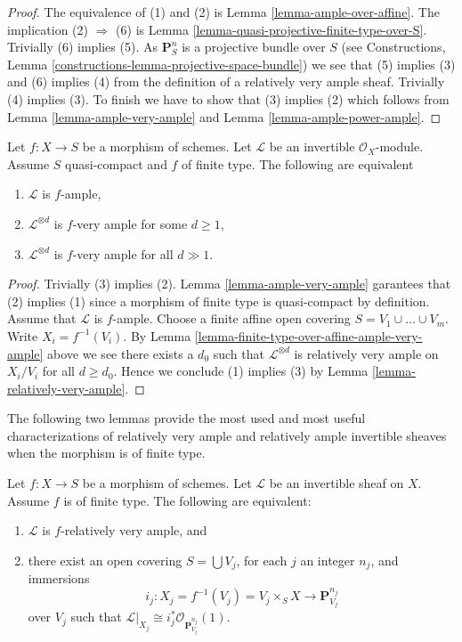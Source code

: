\begin{proof}
The equivalence of (1) and (2) is Lemma \ref{lemma-ample-over-affine}.
The implication (2) $\Rightarrow$ (6) is
Lemma \ref{lemma-quasi-projective-finite-type-over-S}.
Trivially (6) implies (5).
As $\mathbf{P}^n_S$ is a projective bundle over $S$ (see
Constructions, Lemma \ref{constructions-lemma-projective-space-bundle})
we see that
(5) implies (3) and (6) implies (4) from the definition of a
relatively very ample sheaf.
Trivially (4) implies (3). To finish we have to show that
(3) implies (2) which follows from Lemma \ref{lemma-ample-very-ample}
and Lemma \ref{lemma-ample-power-ample}.
\end{proof}

\begin{lemma}
\label{lemma-finite-type-ample-very-ample}
Let $f : X \to S$ be a morphism of schemes.
Let $\mathcal{L}$ be an invertible $\mathcal{O}_X$-module.
Assume $S$ quasi-compact and $f$ of finite type.
The following are equivalent
\begin{enumerate}
\item $\mathcal{L}$ is $f$-ample,
\item $\mathcal{L}^{\otimes d}$ is $f$-very ample for some $d \geq 1$,
\item $\mathcal{L}^{\otimes d}$ is $f$-very ample for all $d \gg 1$.
\end{enumerate}
\end{lemma}

\begin{proof}
Trivially (3) implies (2). Lemma \ref{lemma-ample-very-ample} garantees that
(2) implies (1) since a morphism of finite type is quasi-compact
by definition. Assume that $\mathcal{L}$ is $f$-ample. Choose a finite affine
open covering $S = V_1 \cup \ldots \cup V_m$. Write $X_i = f^{-1}(V_i)$.
By Lemma \ref{lemma-finite-type-over-affine-ample-very-ample} above we see
there exists a $d_0$ such that $\mathcal{L}^{\otimes d}$ is
relatively very ample on $X_i/V_i$ for all $d \geq d_0$. Hence we conclude
(1) implies (3) by Lemma \ref{lemma-relatively-very-ample}.
\end{proof}

\noindent
The following two lemmas provide the most used and most useful
characterizations of relatively very ample and relatively ample
invertible sheaves when the morphism is of finite type.

\begin{lemma}
\label{lemma-characterize-very-ample-on-finite-type}
Let $f : X \to S$ be a morphism of schemes.
Let $\mathcal{L}$ be an invertible sheaf on $X$.
Assume $f$ is of finite type.
The following are equivalent:
\begin{enumerate}
\item $\mathcal{L}$ is $f$-relatively very ample, and
\item there exist an open covering $S = \bigcup V_j$,
for each $j$ an integer $n_j$, and immersions
$$
i_j :
X_j = f^{-1}(V_j) = V_j \times_S X
\longrightarrow
\mathbf{P}^{n_j}_{V_j}
$$
over $V_j$ such that
$\mathcal{L}|_{X_j} \cong i_j^*\mathcal{O}_{\mathbf{P}^{n_j}_{V_j}}(1)$.
\end{enumerate}
\end{lemma}

